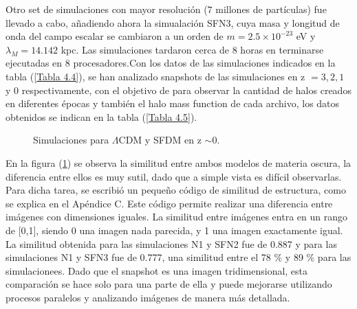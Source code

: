 \documentclass[a4paper,openright,10pt, oneside, final]{book}
\begin{document}
Otro set de simulaciones con mayor resolución (7 millones de partículas) fue llevado a cabo, añadiendo ahora la simualación SFN3, cuya masa y longitud de onda del campo escalar se cambiaron a un orden de $m = 2.5\times10^{-23}$ eV y $\lambda_{M}=14.142$ kpc. Las simulaciones tardaron cerca de 8 horas en terminarse ejecutadas en 8 procesadores.Con los datos de las simulaciones indicados en la tabla (\ref{Tabla 4.4}), se han analizado \textsf{snapshots} de las simulaciones en z $= 3, 2, 1$ y 0 respectivamente, con el objetivo de para observar la cantidad de halos creados en diferentes épocas y también el halo mass function de cada archivo, los datos obtenidos se indican en la tabla (\ref{Tabla 4.5}).




\begin{figure}
\centering
{}
\caption{\footnotesize{Simulaciones para $\Lambda$CDM y SFDM en z $\sim $0.}}\label{fig 4.10}
\end{figure}

En la figura (\ref{fig 4.10}) se observa la similitud entre ambos modelos de materia oscura, la diferencia entre ellos es muy sutil, dado que a simple vista es difícil observarlas. Para dicha tarea, se escribió un pequeño código de similitud de estructura, como se explica en el Apéndice C. Este código permite realizar una diferencia entre imágenes con dimensiones iguales. La similitud entre imágenes entra en un rango de [0,1], siendo 0 una imagen nada parecida, y 1 una imagen exactamente igual. La similitud obtenida para las simulaciones N1 y SFN2 fue de 0.887 y para las simulaciones N1 y SFN3 fue de 0.777, una similitud entre el 78 \% y 89 \% para las simulacionees. Dado que el \textsf{snapshot} es una imagen tridimensional, esta comparación se hace solo para una parte de ella y puede mejorarse utilizando procesos paralelos y analizando imágenes de manera más detallada.
\end{document}

